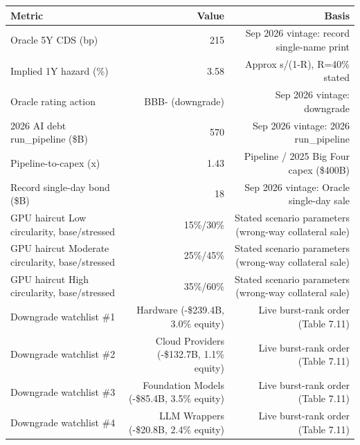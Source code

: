 

\begin{tabular}{@{}lrr@{}}
\toprule
Metric & Value & Basis \\
\midrule
Oracle 5Y CDS (bp) & 215 & Sep 2026 vintage: record single-name print \\
Implied 1Y hazard (\%) & 3.58 & Approx s/(1-R), R=40\% stated \\
Oracle rating action & BBB- (downgrade) & Sep 2026 vintage: downgrade \\
2026 AI debt run\_pipeline (\$B) & 570 & Sep 2026 vintage: 2026 run\_pipeline \\
Pipeline-to-capex (x) & 1.43 & Pipeline / 2025 Big Four capex (\$400B) \\
Record single-day bond (\$B) & 18 & Sep 2026 vintage: Oracle single-day sale \\
GPU haircut Low circularity, base/stressed & 15\%/30\% & Stated scenario parameters (wrong-way collateral sale) \\
GPU haircut Moderate circularity, base/stressed & 25\%/45\% & Stated scenario parameters (wrong-way collateral sale) \\
GPU haircut High circularity, base/stressed & 35\%/60\% & Stated scenario parameters (wrong-way collateral sale) \\
Downgrade watchlist \#1 & Hardware (-\$239.4B, 3.0\% equity) & Live burst-rank order (Table 7.11) \\
Downgrade watchlist \#2 & Cloud Providers (-\$132.7B, 1.1\% equity) & Live burst-rank order (Table 7.11) \\
Downgrade watchlist \#3 & Foundation Models (-\$85.4B, 3.5\% equity) & Live burst-rank order (Table 7.11) \\
Downgrade watchlist \#4 & LLM Wrappers (-\$20.8B, 2.4\% equity) & Live burst-rank order (Table 7.11) \\
\bottomrule
\end{tabular}